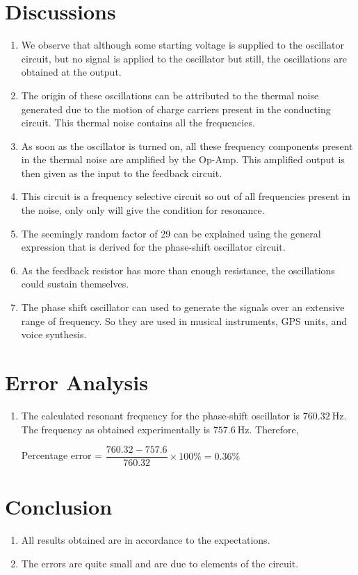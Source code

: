 \section{Discussions}
\begin{enumerate}
    \item We observe that although some starting voltage is supplied to the oscillator circuit, but no signal is applied to the oscillator but still, the oscillations are obtained at the output.
    \item The origin of these oscillations can be attributed to the thermal noise generated due to the motion of charge carriers present in the conducting circuit. This thermal noise contains all the frequencies. 
    \item As soon as the oscillator is turned on, all these frequency components present in the thermal noise are amplified by the Op-Amp. This amplified output is then given as the input to the feedback circuit.
    \item This circuit is a frequency selective circuit so out of all frequencies present in the noise, only only will give the condition for resonance.
    \item The seemingly random factor of 29 can be explained using the general expression that is derived for the phase-shift oscillator circuit.
    \item As the feedback resistor has more than enough resistance, the oscillations could sustain themselves.
    \item The phase shift oscillator can used to generate the signals over an extensive range of frequency. So they are used in musical instruments, GPS units, and voice synthesis.
\end{enumerate}
\section{Error Analysis}
\begin{enumerate}
    \item The calculated resonant frequency for the phase-shift oscillator is $\SI{760.32}{\hertz}$. The frequency as obtained experimentally is $\SI{757.6}{\hertz}$. Therefore,
    \begin{center}
        Percentage error = $\dfrac{760.32-757.6}{760.32}\times 100 \% = 0.36\%$
    \end{center}
\end{enumerate}
\section{Conclusion}
\begin{enumerate}
    \item All results obtained are in accordance to the expectations.
    \item The errors are quite small and are due to elements of the circuit.
\end{enumerate}